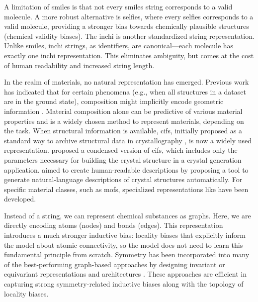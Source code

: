 A limitation of \gls{smiles} is that not every \gls{smiles} string corresponds to a valid molecule.
A more robust alternative is \gls{selfies}\autocite{krenn2020self,cheng2023group}, where every \gls{selfies} corresponds to a valid molecule, providing a stronger bias towards chemically plausible structures (chemical validity biases). 
The \gls{inchi} is another standardized string representation. 
Unlike \gls{smiles}, \gls{inchi} strings, as identifiers, are canonical---each molecule has exactly one \gls{inchi} representation.  
This eliminates ambiguity, but comes at the cost of human readability and increased string length. 

In the realm of materials, no natural representation has emerged.  
Previous work has indicated that for certain phenomena (e.g., when all structures in a dataset are in the ground state), composition might implicitly encode geometric information \autocite{tian2022information, Jha_2018, Wang_2021}. 
Material composition alone can be predictive of various material properties and is a widely chosen method to represent materials, depending on the task. 
When structural information is available, \glspl{cif}, initially proposed as a standard way to archive structural data in crystallography \autocite{hall1991crystallographic}, is now a widely used representation. \textcite{gruver2024finetuned, antunes2024crystal} proposed a condensed version of \glspl{cif}, which includes only the parameters necessary for building the crystal structure in a crystal generation application. \textcite{ganose2019robocrystallographer} aimed to create human-readable descriptions by proposing a tool to generate natural-language descriptions of crystal structures automatically. 
For specific material classes, such as \glspl{mof}, specialized representations like  \autocite{Bucior_2019} have been developed. 


Instead of a string, we can represent chemical substances as graphs. 
Here, we are directly encoding atoms (nodes) and bonds (edges). 
This representation 
introduces a much stronger inductive bias: locality biases that explicitly inform the model about atomic connectivity, so the model does not need to learn this fundamental principle from scratch. Symmetry has been incorporated into many of the best-performing graph-based approaches by designing invariant or equivariant representations \autocite{Langer_2022, Musil_2021} and architectures \autocite{satorras2021n, Batzner_2022}. 
These approaches are efficient in capturing strong symmetry-related inductive biases along with the topology of locality biases. 

